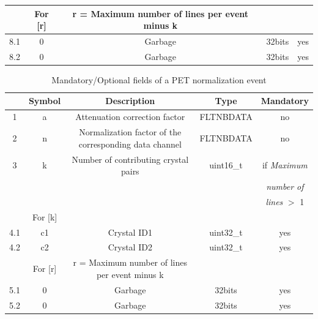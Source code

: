 \documentclass[a4paper, 11pt]{article}
\begin{document}
\begin{table} [h!]
\begin{center}
\begin{tabular}{|c|c|c|c|c|}
  \cellcolor{blue!25}& \cellcolor{blue!25}For [r]&\cellcolor{blue!25}r = Maximum number of lines per event minus k & \cellcolor{blue!25}&\cellcolor{blue!25}  \\ \hline
  8.1 & 0 & Garbage & 32bits & yes \\ \hline
  8.2 & 0 & Garbage & 32bits & yes \\ \hline
  \end{tabular}
  \end{center}
\end{table}

\begin{table} [h!]
  \small
  \caption{Mandatory/Optional fields of a PET normalization event}
  \label{table_PET_data_bin_normalization}
  \begin{center}
  \begin{tabular}{|c|c|c|c|c|}
  \hline
   & \textbf{Symbol} & \textbf{Description} & \textbf{Type} & \textbf{Mandatory}\\
  \hline
  \hline
  1 & a & Attenuation correction factor & FLTNBDATA & no \\ \hline
  2 & n & Normalization factor of the corresponding data channel & FLTNBDATA & no \\ \hline
  3 & k & Number of contributing crystal pairs & uint16\_t & if \textit{Maximum} \\
    & & & &                                                     \textit{number of} \\
    & & & &                                                     \textit{lines} $>$ 1 \\ \hline
  \cellcolor{blue!25}& \cellcolor{blue!25}For [k]&\cellcolor{blue!25}&\cellcolor{blue!25}&\cellcolor{blue!25} \\ \hline
  4.1 & c1 & Crystal ID1 & uint32\_t & yes \\ \hline
  4.2 & c2 & Crystal ID2 & uint32\_t & yes \\ \hline
  \cellcolor{blue!25}& \cellcolor{blue!25}For [r]& \cellcolor{blue!25}r = Maximum number of lines per event minus k & \cellcolor{blue!25}&\cellcolor{blue!25}  \\ \hline
  5.1 & 0 & Garbage & 32bits & yes \\ \hline
  5.2 & 0 & Garbage & 32bits & yes \\ \hline
  \end{tabular}
  \end{center}
\end{table}
\end{document}
